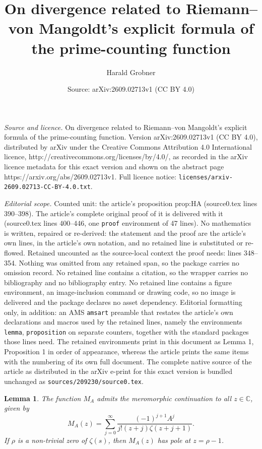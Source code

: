 \documentclass[10pt,a4paper]{amsart}
\title{On divergence related to Riemann--von Mangoldt's explicit formula of the prime-counting function}
\author{Harald Grobner}
\date{Source: arXiv:2609.02713v1 (CC BY 4.0)}
\newtheorem{lemma}{Lemma}
\newcommand{\C}{\mathbb C}
\begin{document}
\maketitle

\noindent\emph{Source and licence.} On divergence related to Riemann--von Mangoldt's explicit formula of the prime-counting function. Version arXiv:2609.02713v1 (CC BY 4.0), distributed by arXiv under the Creative Commons Attribution 4.0 International licence, http://creativecommons.org/licenses/by/4.0/, as recorded in the arXiv licence metadata for this exact version and shown on the abstract page https://arxiv.org/abs/2609.02713v1. Full licence notice: \texttt{licenses/arxiv-2609.02713-CC-BY-4.0.txt}.\par\smallskip

\noindent\textit{Editorial scope.} Counted unit: the article's proposition prop:HA (source0.tex lines 390--398). The article's complete original proof of it is delivered with it (source0.tex lines 400--446, one \texttt{proof} environment of 47 lines). No mathematics is written, repaired or re-derived: the statement and the proof are the article's own lines, in the article's own notation, and no retained line is substituted or re-flowed.  Retained uncounted as the source-local context the proof needs: lines 348--354.  Nothing was omitted from any retained span, so the package carries no omission record.  No retained line contains a citation, so the wrapper carries no bibliography and no bibliography entry.  No retained line contains a figure environment, an image-inclusion command or drawing code, so no image is delivered and the package declares no asset dependency.  Editorial formatting only, in addition: an AMS \texttt{amsart} preamble that restates the article's own declarations and macros used by the retained lines, namely the environments \texttt{lemma}, \texttt{proposition} on separate counters, together with the standard packages those lines need.  The retained environments print in this document as Lemma 1, Proposition 1 in order of appearance, whereas the article prints the same items with the numbering of its own full document.  The complete native source of the article as distributed in the arXiv e-print for this exact version is bundled unchanged as \texttt{sources/209230/source0.tex}.
\begin{lemma}\label{lem:MA}
The function $M_A$ admits the meromorphic continuation to all $z\in\C$, given by
\begin{equation}\label{eq:MA}
M_A(z)= \sum_{j=0}^{\infty} \frac{(-1)^{j+1}A^j}{j!(z+j)\zeta(z+j+1)}.
\end{equation}
If $\rho$ is a non-trivial zero of $\zeta(s)$, then $M_A(z)$ has pole at $z=\rho-1$.
\end{lemma}
\end{document}
